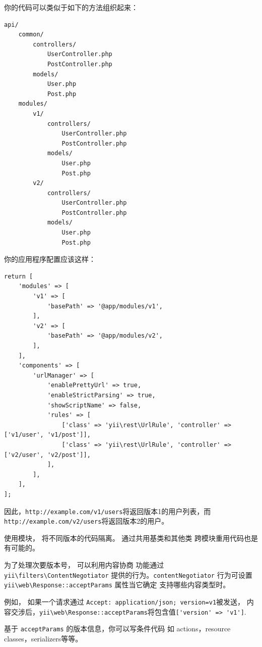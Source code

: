 你的代码可以类似于如下的方法组织起来：

\begin{lstlisting}
api/
    common/
        controllers/
            UserController.php
            PostController.php
        models/
            User.php
            Post.php
    modules/
        v1/
            controllers/
                UserController.php
                PostController.php
            models/
                User.php
                Post.php
        v2/
            controllers/
                UserController.php
                PostController.php
            models/
                User.php
                Post.php
\end{lstlisting}
你的应用程序配置应该这样：

\lstset{language=php}\begin{lstlisting}
return [
    'modules' => [
        'v1' => [
            'basePath' => '@app/modules/v1',
        ],
        'v2' => [
            'basePath' => '@app/modules/v2',
        ],
    ],
    'components' => [
        'urlManager' => [
            'enablePrettyUrl' => true,
            'enableStrictParsing' => true,
            'showScriptName' => false,
            'rules' => [
                ['class' => 'yii\rest\UrlRule', 'controller' => ['v1/user', 'v1/post']],
                ['class' => 'yii\rest\UrlRule', 'controller' => ['v2/user', 'v2/post']],
            ],
        ],
    ],
];
\end{lstlisting}
因此，\lstinline|http://example.com/v1/users|将返回版本1的用户列表，而
\lstinline|http://example.com/v2/users|将返回版本2的用户。

使用模块， 将不同版本的代码隔离。 通过共用基类和其他类
跨模块重用代码也是有可能的。

为了处理次要版本号， 可以利用内容协商
功能通过 \texttt{yii{\allowbreak{}\textbackslash}filters{\allowbreak{}\textbackslash}ContentNegotiator} 提供的行为。\lstinline|contentNegotiator|
行为可设置 \texttt{yii{\allowbreak{}\textbackslash}web{\allowbreak{}\textbackslash}Response\allowbreak{}::\allowbreak{}acceptParams} 属性当它确定
支持哪些内容类型时。

例如， 如果一个请求通过 \lstinline|Accept: application/json; version=v1|被发送，
内容交涉后，\texttt{yii{\allowbreak{}\textbackslash}web{\allowbreak{}\textbackslash}Response\allowbreak{}::\allowbreak{}acceptParams}将包含值\lstinline|['version' => 'v1']|.

基于 \lstinline|acceptParams| 的版本信息，你可以写条件代码
如 actions，resource classes，serializers等等。


